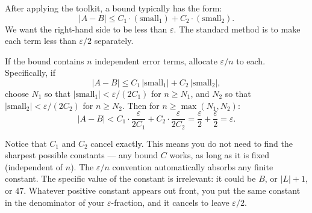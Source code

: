 After applying the toolkit, a bound typically has the form:
\[
  |A - B| \le C_1 \cdot (\text{small}_1) + C_2 \cdot (\text{small}_2).
\]
We want the right-hand side to be less than $\varepsilon$.
The standard method is to make each term less than $\varepsilon/2$
separately.

\begin{tcolorbox}[colback=gray!6, colframe=gray!40, arc=2pt,
  left=8pt, right=8pt, top=6pt, bottom=6pt,
  title={\small\textbf{The \(\varepsilon/n\) Splitting Convention}},
  fonttitle=\small\bfseries]
If the bound contains $n$ independent error terms, allocate
$\varepsilon/n$ to each.
Specifically, if
\[
  |A - B| \le C_1\,|\text{small}_1| + C_2\,|\text{small}_2|,
\]
choose $N_1$ so that $|\text{small}_1| < \varepsilon/(2C_1)$ for $n \ge N_1$,
and $N_2$ so that $|\text{small}_2| < \varepsilon/(2C_2)$ for $n \ge N_2$.
Then for $n \ge \max(N_1, N_2)$:
\[
  |A - B|
  < C_1 \cdot \frac{\varepsilon}{2C_1} + C_2 \cdot \frac{\varepsilon}{2C_2}
  = \frac{\varepsilon}{2} + \frac{\varepsilon}{2}
  = \varepsilon.
\]
\end{tcolorbox}

\begin{remark*}
Notice that $C_1$ and $C_2$ cancel exactly.
This means you do not need to find the sharpest possible constants —
any bound $C$ works, as long as it is fixed (independent of $n$).
The $\varepsilon/n$ convention automatically absorbs any finite
constant.
The specific value of the constant is irrelevant: it could be $B$,
or $|L| + 1$, or $47$.
Whatever positive constant appears out front, you put the same
constant in the denominator of your $\varepsilon$-fraction, and it
cancels to leave $\varepsilon/2$.
\end{remark*}

